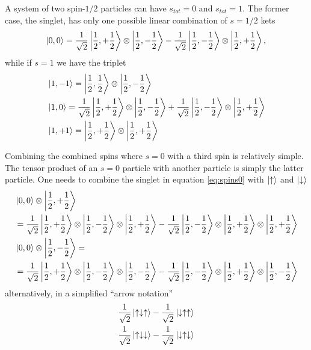 \documentclass{article}
\begin{document}
A system of two spin-$1/2$ particles can have $s_{tot}=0$ and $s_{tot}=1$. The former case, the singlet, has only one possible linear combination of $s=1/2$ kets
\begin{equation}
\label{eq:spins0}
\ket{0,0}=\frac{1}{\sqrt{2}}\ket{\frac{1}{2},+\frac{1}{2}}\otimes\ket{\frac{1}{2},-\frac{1}{2}}-\frac{1}{\sqrt{2}}\ket{\frac{1}{2},-\frac{1}{2}}\otimes\ket{\frac{1}{2},+\frac{1}{2}},
\end{equation}
while if $s=1$ we have the triplet
\begin{align}
\label{eq:spins1-1}
&\ket{1,-1} = \ket{\frac{1}{2},\frac{1}{2}}\otimes\ket{\frac{1}{2},-\frac{1}{2}} \\
\label{eq:spins10}
&\ket{1, 0} = \frac{1}{\sqrt{2}}\ket{\frac{1}{2},+\frac{1}{2}}\otimes\ket{\frac{1}{2},-\frac{1}{2}} + \frac{1}{\sqrt{2}}\ket{\frac{1}{2},-\frac{1}{2}}\otimes\ket{\frac{1}{2},+\frac{1}{2}} \\
\label{eq:spins1+1}
&\ket{1,+1} = \ket{\frac{1}{2},+\frac{1}{2}}\otimes\ket{\frac{1}{2},+\frac{1}{2}}
\end{align}

Combining the combined spins where $s=0$ with a third spin is relatively simple. The tensor product of an $s=0$ particle with another particle is simply the latter particle. One needs to combine the singlet in equation \ref{eq:spins0} with $\ket{\uparrow}$ and $\ket{\downarrow}$
\begin{align*}
&\ket{0,0}\otimes\ket{\frac{1}{2},+\frac{1}{2}} \\
&=\frac{1}{\sqrt{2}}\ket{\frac{1}{2},+\frac{1}{2}}\otimes\ket{\frac{1}{2},-\frac{1}{2}}\otimes\ket{\frac{1}{2},+\frac{1}{2}}-\frac{1}{\sqrt{2}}\ket{\frac{1}{2},-\frac{1}{2}}\otimes\ket{\frac{1}{2},+\frac{1}{2}}\otimes\ket{\frac{1}{2},+\frac{1}{2}} \\
&\ket{0,0}\otimes\ket{\frac{1}{2},-\frac{1}{2}}= \\
&=\frac{1}{\sqrt{2}}\ket{\frac{1}{2},+\frac{1}{2}}\otimes\ket{\frac{1}{2},-\frac{1}{2}}\otimes\ket{\frac{1}{2},-\frac{1}{2}}-\frac{1}{\sqrt{2}}\ket{\frac{1}{2},-\frac{1}{2}}\otimes\ket{\frac{1}{2},+\frac{1}{2}}\otimes\ket{\frac{1}{2},-\frac{1}{2}}
\end{align*}
alternatively, in a simplified ``arrow notation''
\begin{align}
\frac{1}{\sqrt{2}}\ket{\uparrow\downarrow\uparrow}-\frac{1}{\sqrt{2}}\ket{\downarrow\uparrow\uparrow} \\
\frac{1}{\sqrt{2}}\ket{\uparrow\downarrow\downarrow}-\frac{1}{\sqrt{2}}\ket{\downarrow\uparrow\downarrow}
\end{align}
\end{document}
